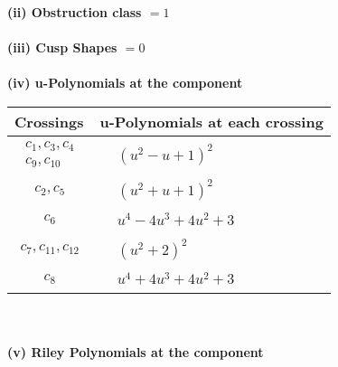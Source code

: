 \documentclass[1p]{elsarticle_modified}
\theoremstyle{definition}
\begin{document}
\flushleft \textbf{(ii) Obstruction class $= 1$}\\~\\
\flushleft \textbf{(iii) Cusp Shapes $= 0$}\\~\\
\newpage\renewcommand{\arraystretch}{1}
\flushleft \textbf{(iv) u-Polynomials at the component}\newline \\
\begin{tabular}{m{50pt}|m{274pt}}
Crossings & \hspace{64pt}u-Polynomials at each crossing \\
\hline $$\begin{aligned}c_{1},c_{3},c_{4}\\c_{9},c_{10}\end{aligned}$$&$\begin{aligned}
&(u^2- u+1)^2
\end{aligned}$\\
\hline $$\begin{aligned}c_{2},c_{5}\end{aligned}$$&$\begin{aligned}
&(u^2+u+1)^2
\end{aligned}$\\
\hline $$\begin{aligned}c_{6}\end{aligned}$$&$\begin{aligned}
&u^4-4 u^3+4 u^2+3
\end{aligned}$\\
\hline $$\begin{aligned}c_{7},c_{11},c_{12}\end{aligned}$$&$\begin{aligned}
&(u^2+2)^2
\end{aligned}$\\
\hline $$\begin{aligned}c_{8}\end{aligned}$$&$\begin{aligned}
&u^4+4 u^3+4 u^2+3
\end{aligned}$\\
\hline
\end{tabular}\\~\\
\newpage\renewcommand{\arraystretch}{1}
\flushleft \textbf{(v) Riley Polynomials at the component}\newline \\
\end{document}
